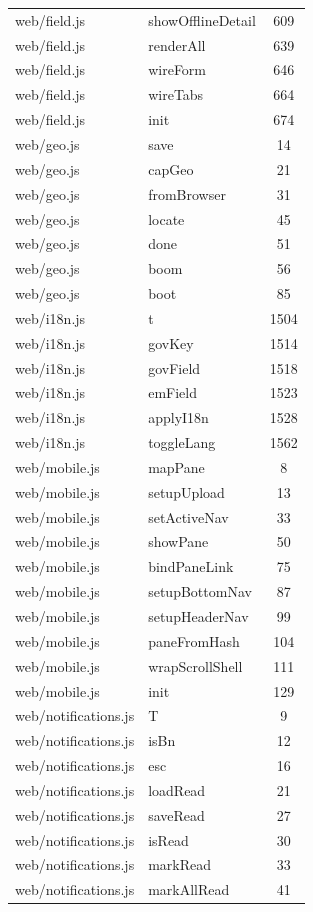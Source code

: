 \begin{center}
\begin{longtable}{@{}p{4.6cm}p{5.2cm}c@{}}
web/field.js & showOfflineDetail & 609 \\
web/field.js & renderAll & 639 \\
web/field.js & wireForm & 646 \\
web/field.js & wireTabs & 664 \\
web/field.js & init & 674 \\
web/geo.js & save & 14 \\
web/geo.js & capGeo & 21 \\
web/geo.js & fromBrowser & 31 \\
web/geo.js & locate & 45 \\
web/geo.js & done & 51 \\
web/geo.js & boom & 56 \\
web/geo.js & boot & 85 \\
web/i18n.js & t & 1504 \\
web/i18n.js & govKey & 1514 \\
web/i18n.js & govField & 1518 \\
web/i18n.js & emField & 1523 \\
web/i18n.js & applyI18n & 1528 \\
web/i18n.js & toggleLang & 1562 \\
web/mobile.js & mapPane & 8 \\
web/mobile.js & setupUpload & 13 \\
web/mobile.js & setActiveNav & 33 \\
web/mobile.js & showPane & 50 \\
web/mobile.js & bindPaneLink & 75 \\
web/mobile.js & setupBottomNav & 87 \\
web/mobile.js & setupHeaderNav & 99 \\
web/mobile.js & paneFromHash & 104 \\
web/mobile.js & wrapScrollShell & 111 \\
web/mobile.js & init & 129 \\
web/notifications.js & T & 9 \\
web/notifications.js & isBn & 12 \\
web/notifications.js & esc & 16 \\
web/notifications.js & loadRead & 21 \\
web/notifications.js & saveRead & 27 \\
web/notifications.js & isRead & 30 \\
web/notifications.js & markRead & 33 \\
web/notifications.js & markAllRead & 41 \\

\end{longtable}
\end{center}
